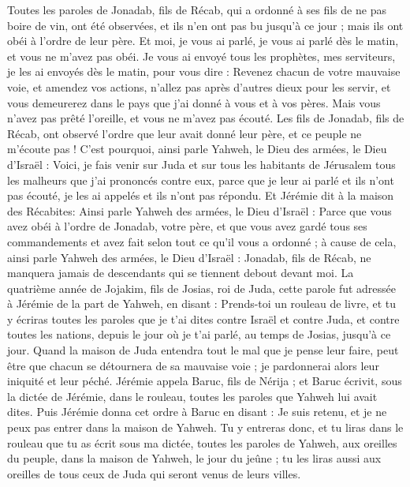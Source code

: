 \begin{multicols}{2}
Toutes les paroles de Jonadab, fils de Récab, qui a ordonné à ses fils de ne pas boire de vin, ont été observées, et ils n'en ont pas bu jusqu’à ce jour ; mais ils ont obéi à l’ordre de leur père. Et moi, je vous ai parlé, je vous ai parlé dès le matin, et vous ne m'avez pas obéi.
Je vous ai envoyé tous les prophètes, mes serviteurs, je les ai envoyés dès le matin, pour vous dire : Revenez chacun de votre mauvaise voie, et amendez vos actions, n’allez pas après d'autres dieux pour les servir, et vous demeurerez dans le pays que j'ai donné à vous et à vos pères. Mais vous n'avez pas prêté l’oreille, et vous ne m'avez pas écouté.
Les fils de Jonadab, fils de Récab, ont observé l’ordre que leur avait donné leur père, et ce peuple ne m'écoute pas !
C’est pourquoi, ainsi parle Yahweh, le Dieu des armées, le Dieu d'Israël : Voici, je fais venir sur Juda et sur tous les habitants de Jérusalem tous les malheurs que j'ai prononcés contre eux, parce que je leur ai parlé et ils n'ont pas écouté, je les ai appelés et ils n'ont pas répondu.
Et Jérémie dit à la maison des Récabites: Ainsi parle Yahweh des armées, le Dieu d'Israël : Parce que vous avez obéi à l’ordre de Jonadab, votre père, et que vous avez gardé tous ses commandements et avez fait selon tout ce qu'il vous a ordonné ;
à cause de cela, ainsi parle Yahweh des armées, le Dieu d'Israël : Jonadab, fils de Récab, ne manquera jamais de descendants qui se tiennent debout devant moi.
\VerseOne{}La quatrième année de Jojakim, fils de Josias, roi de Juda, cette parole fut adressée à Jérémie de la part de Yahweh, en disant :
Prends-toi un rouleau de livre, et tu y écriras toutes les paroles que je t’ai dites contre Israël et contre Juda, et contre toutes les nations, depuis le jour où je t'ai parlé, au temps de Josias, jusqu’à ce jour.
Quand la maison de Juda entendra tout le mal que je pense leur faire, peut être que chacun se détournera de sa mauvaise voie ; je pardonnerai alors leur iniquité et leur péché.
Jérémie appela Baruc, fils de Nérija ; et Baruc écrivit, sous la dictée de Jérémie, dans le rouleau, toutes les paroles que Yahweh lui avait dites.
Puis Jérémie donna cet ordre à Baruc en disant : Je suis retenu, et je ne peux pas entrer dans la maison de Yahweh.
Tu y entreras donc, et tu liras dans le rouleau que tu as écrit sous ma dictée, toutes les paroles de Yahweh, aux oreilles du peuple, dans la maison de Yahweh, le jour du jeûne ; tu les liras aussi aux oreilles de tous ceux de Juda qui seront venus de leurs villes.

\end{multicols}
